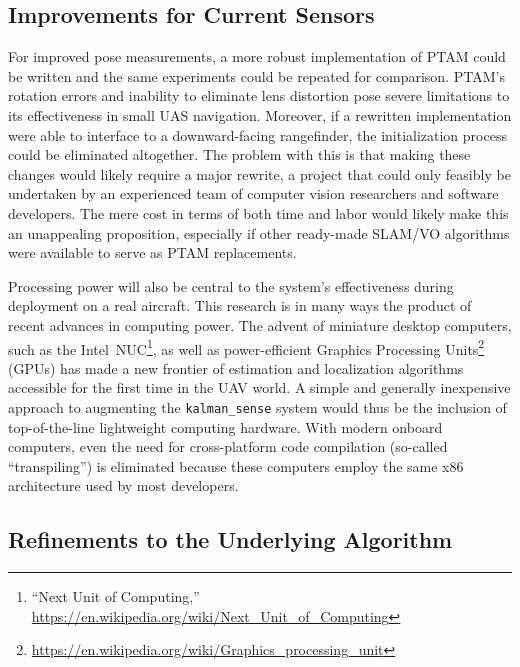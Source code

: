 \subsection{Improvements for Current Sensors}

For improved pose measurements, a more robust implementation of PTAM could be written and the same experiments could be repeated for comparison. PTAM's rotation errors and inability to eliminate lens distortion pose severe limitations to its effectiveness in small UAS navigation. Moreover, if a rewritten implementation were able to interface to a downward-facing rangefinder, the initialization process could be eliminated altogether. The problem with this is that making these changes would likely require a major rewrite, a project that could only feasibly be undertaken by an experienced team of computer vision researchers and software developers. The mere cost in terms of both time and labor would likely make this an unappealing proposition, especially if other ready-made SLAM/VO algorithms were available to serve as PTAM replacements.

Processing power will also be central to the system's effectiveness during deployment on a real aircraft. This research is in many ways the product of recent advances in computing power. The advent of miniature desktop computers, such as the Intel~NUC\footnote{``Next Unit of Computing,'' \url{https://en.wikipedia.org/wiki/Next_Unit_of_Computing}}, as well as power-efficient Graphics Processing Units\footnote{\url{https://en.wikipedia.org/wiki/Graphics_processing_unit}} (GPUs) has made a new frontier of estimation and localization algorithms accessible for the first time in the UAV world. A simple and generally inexpensive approach to augmenting the \texttt{kalman\_sense} system would thus be the inclusion of top-of-the-line lightweight computing hardware. With modern onboard computers, even the need for cross-platform code compilation (so-called ``transpiling'') is eliminated because these computers employ the same x86 architecture used by most developers.

\subsection{Refinements to the Underlying Algorithm}

